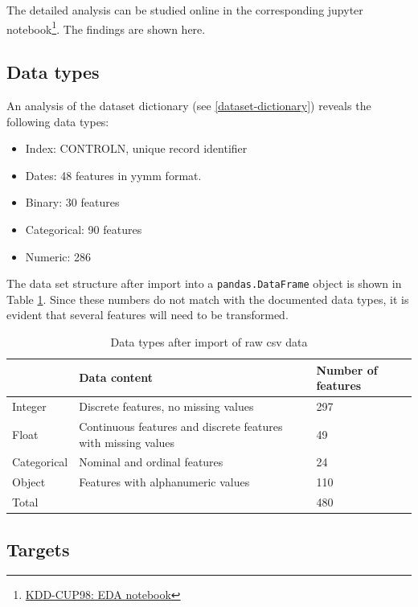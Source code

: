 \documentclass[
  11pt,
  a4paper,
  DIV=12,captions=tableheading,oneside]{scrbook}
\providecommand{\tightlist}{%
  \setlength{\itemsep}{0pt}\setlength{\parskip}{0pt}}
\providecommand{\tightlist}{%
  \setlength{\itemsep}{0pt}\setlength{\parskip}{0pt}}
\begin{document}
The detailed analysis can be studied online in the corresponding jupyter notebook\footnote{\href{https://github.com/datarian/master-thesis-code/blob/development/notebooks/eda.ipynb}{KDD-CUP98: EDA notebook}}. The findings are shown here.

\hypertarget{data-types}{%
\subsection{Data types}\label{data-types}}

An analysis of the dataset dictionary (see \ref{dataset-dictionary}) reveals the following data types:

\begin{itemize}
\tightlist
\item
  Index: CONTROLN, unique record identifier
\item
  Dates: 48 features in yymm format.
\item
  Binary: 30 features
\item
  Categorical: 90 features
\item
  Numeric: 286
\end{itemize}

The data set structure after import into a \texttt{pandas.DataFrame} object is shown in Table \ref{tab:data-desc}. Since these numbers do not match with the documented data types, it is evident that several features will need to be transformed.

\begin{table}[!h]

\caption{\label{tab:data-desc}Data types after import of raw csv data}
\centering
\begin{tabular}{l>{\raggedright\arraybackslash}p{6cm}l}
\toprule
  & Data content & Number of features\\
\midrule
Integer & Discrete features, no missing values & 297\\
Float & Continuous features and discrete features with missing values & 49\\
Categorical & Nominal and ordinal features & 24\\
Object & Features with alphanumeric values & 110\\
Total &  & 480\\
\bottomrule
\end{tabular}
\end{table}

\hypertarget{targets}{%
\subsection{Targets}\label{targets}}
\end{document}
